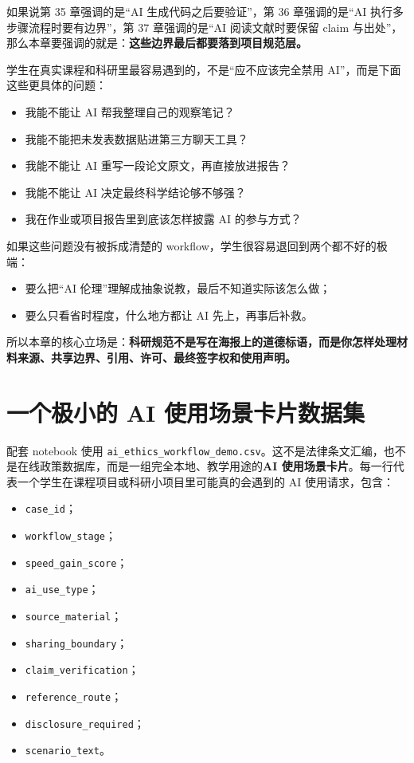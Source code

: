 如果说第 35 章强调的是“AI 生成代码之后要验证”，第 36 章强调的是“AI 执行多步骤流程时要有边界”，第 37 章强调的是“AI 阅读文献时要保留 claim 与出处”，那么本章要强调的就是：\textbf{这些边界最后都要落到项目规范层。}

学生在真实课程和科研里最容易遇到的，不是“应不应该完全禁用 AI”，而是下面这些更具体的问题：

\begin{itemize}
    \item 我能不能让 AI 帮我整理自己的观察笔记？
    \item 我能不能把未发表数据贴进第三方聊天工具？
    \item 我能不能让 AI 重写一段论文原文，再直接放进报告？
    \item 我能不能让 AI 决定最终科学结论够不够强？
    \item 我在作业或项目报告里到底该怎样披露 AI 的参与方式？
\end{itemize}

如果这些问题没有被拆成清楚的 workflow，学生很容易退回到两个都不好的极端：

\begin{itemize}
    \item 要么把“AI 伦理”理解成抽象说教，最后不知道实际该怎么做；
    \item 要么只看省时程度，什么地方都让 AI 先上，再事后补救。
\end{itemize}

所以本章的核心立场是：\textbf{科研规范不是写在海报上的道德标语，而是你怎样处理材料来源、共享边界、引用、许可、最终签字权和使用声明。}

\section{一个极小的 AI 使用场景卡片数据集}

配套 notebook 使用 \nolinkurl{ai_ethics_workflow_demo.csv}。这不是法律条文汇编，也不是在线政策数据库，而是一组完全本地、教学用途的\textbf{AI 使用场景卡片}。每一行代表一个学生在课程项目或科研小项目里可能真的会遇到的 AI 使用请求，包含：

\begin{itemize}
    \item \texttt{case\_id}；
    \item \texttt{workflow\_stage}；
    \item \texttt{speed\_gain\_score}；
    \item \texttt{ai\_use\_type}；
    \item \texttt{source\_material}；
    \item \texttt{sharing\_boundary}；
    \item \texttt{claim\_verification}；
    \item \texttt{reference\_route}；
    \item \texttt{disclosure\_required}；
    \item \texttt{scenario\_text}。
\end{itemize}

